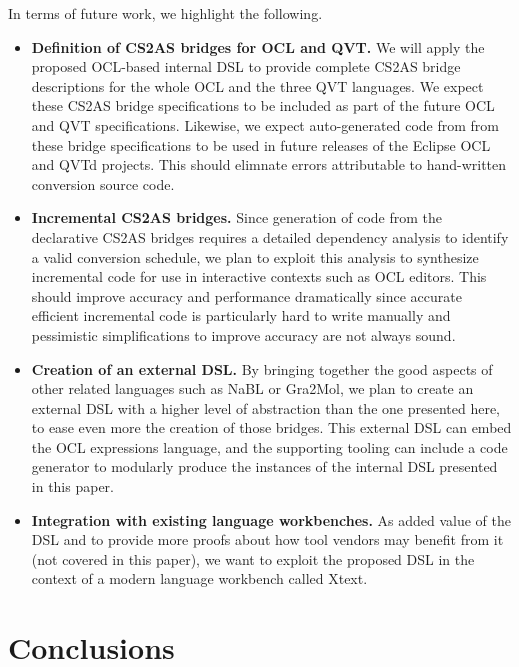 \documentclass{llncs}
\begin{document}
In terms of future work, we highlight the following.

\begin{itemize}
\item \textbf{Definition of CS2AS bridges for OCL and QVT.} We will apply the proposed OCL-based internal DSL to provide complete CS2AS bridge descriptions for the whole OCL and the three QVT languages. We expect these CS2AS bridge specifications to be included as part of the future OCL and QVT specifications. Likewise, we expect auto-generated code from from these bridge specifications to be used in future releases of the Eclipse OCL and QVTd projects. This should elimnate errors attributable to hand-written conversion source code.

\item \textbf{Incremental CS2AS bridges.} Since generation of code from the declarative CS2AS bridges requires a detailed dependency analysis to identify a valid conversion schedule, we plan to exploit this analysis to synthesize incremental code for use in interactive contexts such as OCL editors. This should improve accuracy and performance dramatically since accurate efficient incremental code is particularly hard to write manually and pessimistic simplifications to improve accuracy are not always sound.

\item \textbf{Creation of an external DSL.} By bringing together the good aspects of other related languages such as NaBL or Gra2Mol, we plan to create an external DSL with a higher level of abstraction than the one presented here, to ease even more the creation of those bridges. This external DSL can embed the OCL expressions language, and the supporting tooling can include a code generator to modularly produce the instances of the internal DSL presented in this paper.

\item \textbf{Integration with existing language workbenches.} As added value of the DSL and to provide more proofs about how tool vendors may benefit from it (not covered in this paper), we want to exploit the proposed DSL in the context of a modern language workbench called Xtext.


\end{itemize}

\section{Conclusions}
\label{sec:conclusions}
\end{document}

